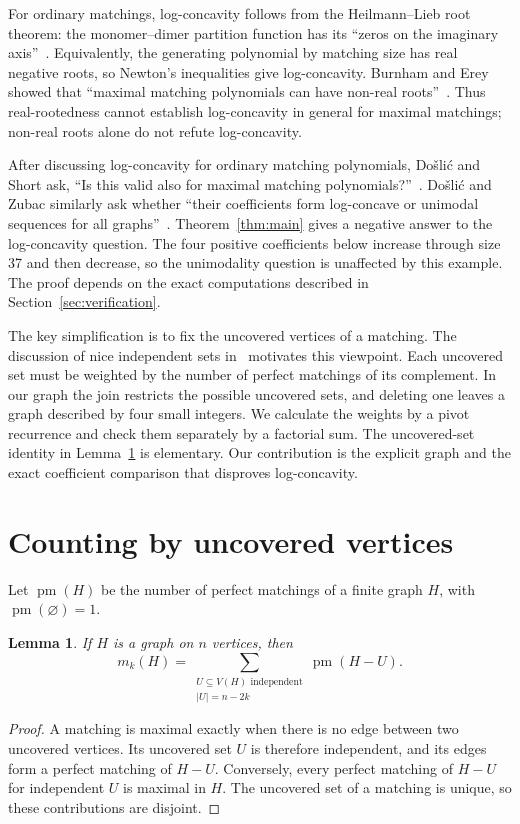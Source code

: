 \documentclass[11pt]{article}
\newtheorem{lemma}[theorem]{Lemma}
\begin{document}
For ordinary matchings, log-concavity follows from the Heilmann--Lieb
root theorem: the monomer--dimer partition function has its ``zeros on
the imaginary axis''~\cite[abstract]{HL}. Equivalently, the generating
polynomial by matching size has real negative roots, so Newton's
inequalities give log-concavity. Burnham and Erey showed that ``maximal
matching polynomials can have non-real roots''~\cite[abstract]{BE}.
Thus real-rootedness cannot establish log-concavity in general for
maximal matchings; non-real roots alone do not refute log-concavity.

After discussing log-concavity for ordinary matching polynomials,
Do\v{s}li\'c and Short ask, ``Is this valid also for maximal matching
polynomials?''~\cite[p.~20 of the preprint]{DS}.
Do\v{s}li\'c and Zubac similarly ask whether ``their coefficients form
log-concave or unimodal sequences for all graphs''~\cite[p.~275]{DZ}.
Theorem~\ref{thm:main} gives a negative answer to the log-concavity
question. The four positive coefficients below increase through size
37 and then decrease, so the unimodality question is unaffected by this
example. The proof depends on the exact computations described in
Section~\ref{sec:verification}.

The key simplification is to fix the uncovered vertices of a matching.
The discussion of nice independent sets in~\cite[p.~13 of the
preprint]{DS} motivates this viewpoint. Each uncovered set must be
weighted by the number of perfect matchings of its complement. In our
graph the join restricts the possible uncovered sets, and deleting one
leaves a graph described by four small integers. We calculate the
weights by a pivot recurrence and check them separately by a factorial
sum. The uncovered-set identity in Lemma~\ref{lem:uncovered} is
elementary. Our contribution is the explicit graph and the exact
coefficient comparison that disproves log-concavity.

\section{Counting by uncovered vertices}
Let $\operatorname{pm}(H)$ be the number of perfect matchings of a finite
graph $H$, with $\operatorname{pm}(\varnothing)=1$.

\begin{lemma}\label{lem:uncovered}
If $H$ is a graph on $n$ vertices, then
\[
m_k(H)=\sum_{\substack{U\subseteq V(H)\text{ independent}\\|U|=n-2k}}
          \operatorname{pm}(H-U).
\]
\end{lemma}
\begin{proof}
A matching is maximal exactly when there is no edge between two
uncovered vertices. Its uncovered set $U$ is therefore independent,
and its edges form a perfect matching of $H-U$. Conversely, every
perfect matching of $H-U$ for independent $U$ is maximal in $H$.
The uncovered set of a matching is unique, so these contributions are
disjoint.
\end{proof}
\end{document}
